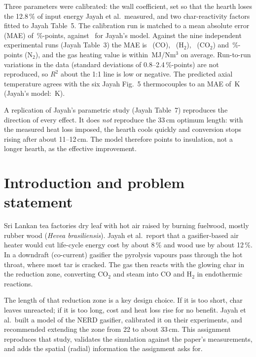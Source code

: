 \documentclass[11pt,a4paper]{article}
\begin{document}
Three parameters were calibrated: the wall coefficient, set so that the hearth loses the 12.8\,\% of input energy Jayah et al.\ measured, and two char-reactivity factors fitted to Jayah Table~5. The calibration run is matched to a mean absolute error (MAE) of \RCalMAE\,\%-points, against \RCalMAEJ\ for Jayah's model. Against the nine independent experimental runs (Jayah Table~3) the MAE is \RMAECO\ (CO), \RMAEHtwo\ (H$_2$), \RMAECOtwo\ (CO$_2$) and \RMAENtwo\,\%-points (N$_2$), and the gas heating value is within \RMAELHV\,MJ/Nm$^3$ on average. Run-to-run variations in the data (standard deviations of 0.8--2.4\,\%-points) are not reproduced, so $R^2$ about the 1:1 line is low or negative. The predicted axial temperature agrees with the six Jayah Fig.~5 thermocouples to an MAE of \RTempMAE\,K (Jayah's model: \RTempMAEJ\,K).

A replication of Jayah's parametric study (Jayah Table~7) reproduces the direction of every effect. It does \emph{not} reproduce the 33\,cm optimum length: with the measured heat loss imposed, the hearth cools quickly and conversion stops rising after about 11--12\,cm. The model therefore points to insulation, not a longer hearth, as the effective improvement.

\section{Introduction and problem statement}
Sri Lankan tea factories dry leaf with hot air raised by burning fuelwood, mostly rubber wood (\emph{Hevea brasiliensis}). Jayah et al.\ report that a gasifier-based air heater would cut life-cycle energy cost by about 8\,\% and wood use by about 12\,\%. In a downdraft (co-current) gasifier the pyrolysis vapours pass through the hot throat, where most tar is cracked. The gas then reacts with the glowing char in the reduction zone, converting CO$_2$ and steam into CO and H$_2$ in endothermic reactions.

The length of that reduction zone is a key design choice. If it is too short, char leaves unreacted; if it is too long, cost and heat loss rise for no benefit. Jayah et al.\ built a model of the NERD gasifier, calibrated it on their experiments, and recommended extending the zone from 22 to about 33\,cm. This assignment reproduces that study, validates the simulation against the paper's measurements, and adds the spatial (radial) information the assignment asks for.
\end{document}
